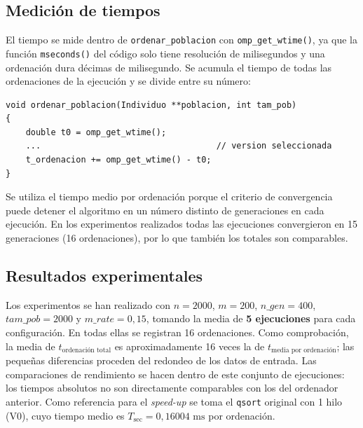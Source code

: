 \documentclass[12pt]{article}
\begin{document}
\begin{enumerate}
\subsection*{Medición de tiempos}
 
El tiempo se mide dentro de \texttt{ordenar\_poblacion} con \texttt{omp\_get\_wtime()}, ya que la función \texttt{mseconds()} del código solo tiene resolución de milisegundos y una ordenación dura décimas de milisegundo. Se acumula el tiempo de todas las ordenaciones de la ejecución y se divide entre su número:
 
\begin{lstlisting}[style=EstiloC]
void ordenar_poblacion(Individuo **poblacion, int tam_pob)
{
    double t0 = omp_get_wtime();
    ...                                   // version seleccionada
    t_ordenacion += omp_get_wtime() - t0;
}
\end{lstlisting}
 
Se utiliza el tiempo medio por ordenación porque el criterio de convergencia puede detener el algoritmo en un número distinto de generaciones en cada ejecución. En los experimentos realizados todas las ejecuciones convergieron en 15 generaciones (16 ordenaciones), por lo que también los totales son comparables.
 
\subsection*{Resultados experimentales}
 
Los experimentos se han realizado con $n = 2000$, $m = 200$, $n\_gen = 400$, $tam\_pob = 2000$ y $m\_rate = 0,15$, tomando la media de \textbf{5 ejecuciones} para cada configuración. En todas ellas se registran 16 ordenaciones. Como comprobación, la media de $t_{\text{ordenación total}}$ es aproximadamente 16 veces la de $t_{\text{media por ordenación}}$; las pequeñas diferencias proceden del redondeo de los datos de entrada. Las comparaciones de rendimiento se hacen dentro de este conjunto de ejecuciones: los tiempos absolutos no son directamente comparables con los del ordenador anterior. Como referencia para el \textit{speed-up} se toma el \texttt{qsort} original con 1 hilo (V0), cuyo tiempo medio es $T_{\text{sec}} = 0,16004\text{ ms}$ por ordenación.
 

\end{enumerate}
\end{document}
